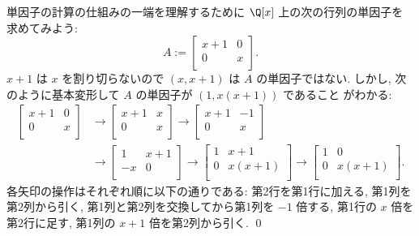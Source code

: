 \documentclass[12pt,twoside]{jarticle}
\begin{document}
\begin{example}
\label{example:elem-div-1}
  単因子の計算の仕組みの一端を理解するために $\Q[x]$ 上の次の行列の単因子を
  求めてみよう:
  \begin{equation*}
    A := 
    \begin{bmatrix}
      x+1 & 0  \\
       0  & x \\
    \end{bmatrix}.
  \end{equation*}
  $x+1$ は $x$ を割り切らないので $(x,x+1)$ は $A$ の単因子ではない.
  しかし, 次のように基本変形して $A$ の単因子が $(1,x(x+1))$ であること
  がわかる:
  \begin{align*}
    \begin{bmatrix}
      x+1 & 0 \\
       0  & x \\
    \end{bmatrix}
    &
    \to
    \begin{bmatrix}
      x+1 & x \\
       0  & x \\
    \end{bmatrix}
    \to
    \begin{bmatrix}
      x+1 & -1 \\
       0  &  x \\
    \end{bmatrix}
    \\ &
    \to
    \begin{bmatrix}
      1  & x+1 \\
      -x &  0  \\
    \end{bmatrix}
    \to
    \begin{bmatrix}
      1 & x+1 \\
      0 & x(x+1) \\
    \end{bmatrix}
    \to
    \begin{bmatrix}
      1 & 0 \\
      0 & x(x+1) \\
    \end{bmatrix}.
  \end{align*}
  各矢印の操作はそれぞれ順に以下の通りである: 
  第2行を第1行に加える, 
  第1列を第2列から引く,
  第1列と第2列を交換してから第1列を $-1$ 倍する,
  第1行の $x$ 倍を第2行に足す,
  第1列の $x+1$ 倍を第2列から引く.
  \qed
\end{example}
\end{document}
